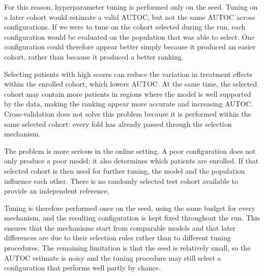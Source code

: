 \vspace{10pt}

For this reason, hyperparameter tuning is performed only on the seed. Tuning
on a later cohort would estimate a valid AUTOC, but not the same AUTOC across
configurations. If we were to tune on the cohort selected during the run,
each configuration would be evaluated on the population that was able to select.
One configuration could therefore appear better simply
because it produced an easier cohort, rather than because it produced a better
ranking.

\vspace{10pt}

Selecting patients with high
scores can reduce the variation in treatment effects within the enrolled
cohort, which lowers AUTOC. At the same time, the selected cohort may contain
more patients in regions where the model is well supported by the data, making
the ranking appear more accurate and increasing AUTOC. Cross-validation does
not solve this problem because it is performed within the same selected
cohort: every fold has already passed through the selection mechanism.

\vspace{10pt}

The problem is more serious in the online setting. A poor configuration does
not only produce a poor model; it also determines which patients are enrolled.
If that selected cohort is then used for further tuning, the model and the
population influence each other. There is no randomly selected test cohort
available to provide an independent reference.

\vspace{10pt}

Tuning is therefore performed once on the seed, using the same budget for every
mechanism, and the resulting configuration is kept fixed throughout the run.
This ensures that the mechanisms start from comparable models and that later
differences are due to their selection rules rather than to different tuning
procedures. The remaining limitation is that the seed is relatively small, so
the AUTOC estimate is noisy and the tuning procedure may still select a
configuration that performs well partly by chance.


